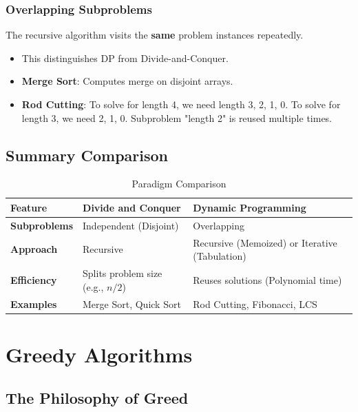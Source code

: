 \documentclass[12pt]{article}
\theoremstyle{blueplain}
\theoremstyle{bluedef}
\theoremstyle{blueremark}
\begin{document}
\subsubsection{Overlapping Subproblems}
The recursive algorithm visits the \textbf{same} problem instances repeatedly.
\begin{itemize}
    \item This distinguishes DP from Divide-and-Conquer.
    \item \textbf{Merge Sort}: Computes merge on disjoint arrays.
    \item \textbf{Rod Cutting}: To solve for length 4, we need length 3, 2, 1, 0. To solve for length 3, we need 2, 1, 0. Subproblem "length 2" is reused multiple times.
\end{itemize}

\subsection{Summary Comparison}

\begin{table}[h]
    \centering
    \begin{tabular}{|l|l|l|}
        \hline
        \textbf{Feature}     & \textbf{Divide and Conquer}       & \textbf{Dynamic Programming}                   \\ \hline
        \textbf{Subproblems} & Independent (Disjoint)            & Overlapping                                    \\ \hline
        \textbf{Approach}    & Recursive                         & Recursive (Memoized) or Iterative (Tabulation) \\ \hline
        \textbf{Efficiency}  & Splits problem size (e.g., $n/2$) & Reuses solutions (Polynomial time)             \\ \hline
        \textbf{Examples}    & Merge Sort, Quick Sort            & Rod Cutting, Fibonacci, LCS                    \\ \hline
    \end{tabular}
    \caption{Paradigm Comparison}
\end{table}

\clearpage


\section{Greedy Algorithms}

\subsection{The Philosophy of Greed}
\end{document}
